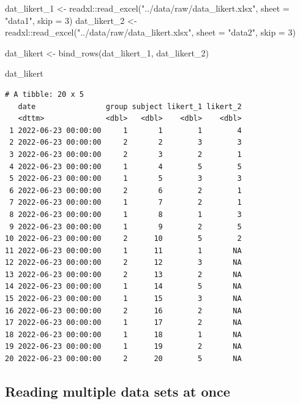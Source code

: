 \documentclass[
  letterpaper,
  DIV=11,
  numbers=noendperiod]{scrreprt}
\newenvironment{Shaded}{\begin{snugshade}}{\end{snugshade}}
\newcommand{\AttributeTok}[1]{\textcolor[rgb]{0.40,0.45,0.13}{#1}}
\newcommand{\DecValTok}[1]{\textcolor[rgb]{0.68,0.00,0.00}{#1}}
\newcommand{\FunctionTok}[1]{\textcolor[rgb]{0.28,0.35,0.67}{#1}}
\newcommand{\NormalTok}[1]{\textcolor[rgb]{0.00,0.23,0.31}{#1}}
\newcommand{\OtherTok}[1]{\textcolor[rgb]{0.00,0.23,0.31}{#1}}
\newcommand{\SpecialCharTok}[1]{\textcolor[rgb]{0.37,0.37,0.37}{#1}}
\newcommand{\StringTok}[1]{\textcolor[rgb]{0.13,0.47,0.30}{#1}}
\begin{document}
\begin{Shaded}
\begin{Highlighting}[]
\NormalTok{dat\_likert\_1 }\OtherTok{\textless{}{-}}\NormalTok{ readxl}\SpecialCharTok{::}\FunctionTok{read\_excel}\NormalTok{(}\StringTok{"../data/raw/data\_likert.xlsx"}\NormalTok{, }\AttributeTok{sheet =} \StringTok{"data1"}\NormalTok{, }\AttributeTok{skip =} \DecValTok{3}\NormalTok{)}
\NormalTok{dat\_likert\_2 }\OtherTok{\textless{}{-}}\NormalTok{ readxl}\SpecialCharTok{::}\FunctionTok{read\_excel}\NormalTok{(}\StringTok{"../data/raw/data\_likert.xlsx"}\NormalTok{, }\AttributeTok{sheet =} \StringTok{"data2"}\NormalTok{, }\AttributeTok{skip =} \DecValTok{3}\NormalTok{)}

\NormalTok{dat\_likert }\OtherTok{\textless{}{-}} \FunctionTok{bind\_rows}\NormalTok{(dat\_likert\_1,}
\NormalTok{                        dat\_likert\_2)}

\NormalTok{dat\_likert}
\end{Highlighting}
\end{Shaded}

\begin{verbatim}
# A tibble: 20 x 5
   date                group subject likert_1 likert_2
   <dttm>              <dbl>   <dbl>    <dbl>    <dbl>
 1 2022-06-23 00:00:00     1       1        1        4
 2 2022-06-23 00:00:00     2       2        3        3
 3 2022-06-23 00:00:00     2       3        2        1
 4 2022-06-23 00:00:00     1       4        5        5
 5 2022-06-23 00:00:00     1       5        3        3
 6 2022-06-23 00:00:00     2       6        2        1
 7 2022-06-23 00:00:00     1       7        2        1
 8 2022-06-23 00:00:00     1       8        1        3
 9 2022-06-23 00:00:00     1       9        2        5
10 2022-06-23 00:00:00     2      10        5        2
11 2022-06-23 00:00:00     1      11        1       NA
12 2022-06-23 00:00:00     2      12        3       NA
13 2022-06-23 00:00:00     2      13        2       NA
14 2022-06-23 00:00:00     1      14        5       NA
15 2022-06-23 00:00:00     1      15        3       NA
16 2022-06-23 00:00:00     2      16        2       NA
17 2022-06-23 00:00:00     1      17        2       NA
18 2022-06-23 00:00:00     1      18        1       NA
19 2022-06-23 00:00:00     1      19        2       NA
20 2022-06-23 00:00:00     2      20        5       NA
\end{verbatim}

\subsection{Reading multiple data sets at
once}\label{reading-multiple-data-sets-at-once}
\end{document}

